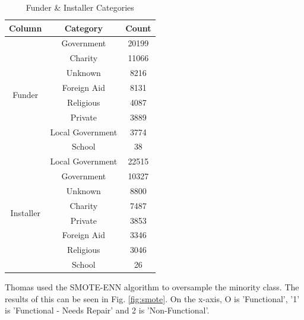 \documentclass[conference]{IEEEtran}
\begin{document}
\begin{table}[h]
  \centering
  \caption{Funder \& Installer Categories}
  \label{tab:funder_installer_categories}
  \begin{tabular}{|c|c|c|}
    \hline
    Column & Category & Count \\
    \hline
    \multirow{8}{*}{Funder} & Government & 20199 \\
    & Charity & 11066 \\
    & Unknown & 8216 \\
    & Foreign Aid & 8131 \\
    & Religious & 4087 \\
    & Private & 3889 \\
    & Local Government & 3774 \\
    & School & 38 \\
    \hline
    \multirow{8}{*}{Installer} & Local Government & 22515 \\
    & Government & 10327 \\
    & Unknown & 8800 \\
    & Charity & 7487 \\
    & Private & 3853 \\
    & Foreign Aid & 3346 \\
    & Religious & 3046 \\
    & School & 26 \\
    \hline
  \end{tabular}
\end{table}

Thomas used the SMOTE-ENN algorithm to oversample the minority class. The results of this can be seen in Fig. \ref{fig:smote}. On the x-axis, O is 'Functional', '1' is 'Functional - Needs Repair' and 2 is 'Non-Functional'. 
\end{document}
